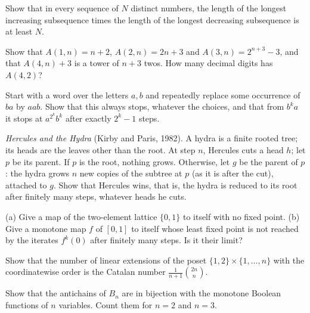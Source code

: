 \begin{exercise}[$\star$]\label{orders:ex:esproduct}
Show that in every sequence of $N$ distinct numbers, the length of the longest increasing subsequence times the length of
the longest decreasing subsequence is at least $N$.
\end{exercise}

\begin{exercise}[$\star$]\label{orders:ex:ackermannvalues}
Show that $A(1,n)=n+2$, $A(2,n)=2n+3$ and $A(3,n)=2^{n+3}-3$, and that $A(4,n)+3$ is a tower of $n+3$ twos. How many decimal digits has
$A(4,2)$?
\end{exercise}

\begin{exercise}[$\star\star$]\label{orders:ex:rewriting}
Start with a word over the letters $a,b$ and repeatedly replace some occurrence of $ba$ by $aab$. Show that this always
stops, whatever the choices, and that from $b^ka$ it stops at $a^{2^k}b^k$ after exactly $2^k-1$ steps.
\end{exercise}

\begin{exercise}[$\star\star\star$]\label{orders:ex:hydra}
\emph{Hercules and the Hydra} (Kirby and Paris, 1982). A hydra is a finite rooted tree; its heads are the leaves other than the
root. At step $n$, Hercules cuts a head $h$; let $p$ be its parent. If $p$ is the root, nothing grows. Otherwise, let $g$ be the parent
of $p$: the hydra grows $n$ new copies of the subtree at $p$ (as it is after the cut), attached to $g$. Show that Hercules wins, that is,
the hydra is reduced to its root after finitely many steps, whatever heads he cuts.
\end{exercise}

\begin{exercise}[$\star$]\label{orders:ex:fixedpoints}
(a) Give a map of the two-element lattice $\{0,1\}$ to itself with no fixed point. (b) Give a monotone map $f$ of $[0,1]$ to itself
whose least fixed point is not reached by the iterates $f^k(0)$ after finitely many steps. Is it their limit?
\end{exercise}

\begin{exercise}[$\star\star$]\label{orders:ex:youngtableaux}
Show that the number of linear extensions of the poset $\{1,2\}\times\{1,\dots,n\}$ with the coordinatewise order is the Catalan number
$\frac1{n+1}\binom{2n}n$.
\end{exercise}

\begin{exercise}[$\star$]\label{orders:ex:dedekind}
Show that the antichains of $B_n$ are in bijection with the monotone Boolean functions of $n$ variables. Count them for $n=2$
and $n=3$.
\end{exercise}

